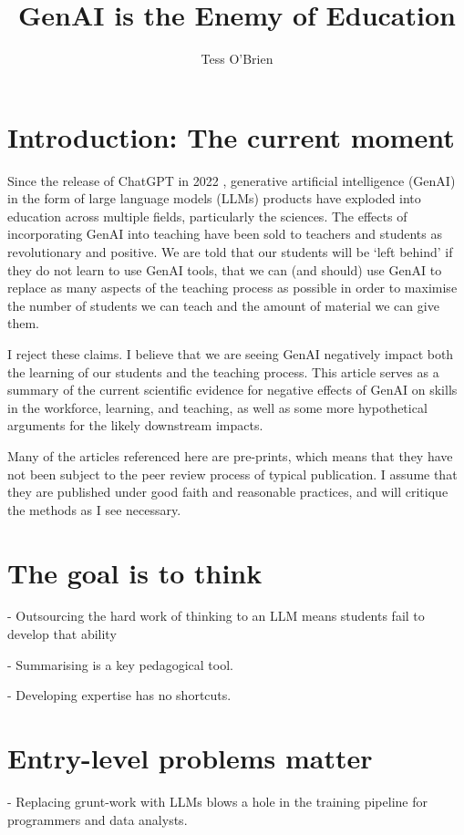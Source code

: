 \documentclass[12pt]{article}
\title{GenAI is the Enemy of Education}
\author{Tess O'Brien}
\begin{document}
\maketitle



\section{Introduction: The current moment}
Since the release of ChatGPT in 2022 \citep{chatgptRelease2022}, generative artificial intelligence (GenAI) in the form of large language models (LLMs) products have exploded into education across multiple fields, particularly the sciences. The effects of incorporating GenAI into teaching have been sold to teachers and students as revolutionary and positive. We are told that our students will be `left behind' if they do not learn to use GenAI tools, that we can (and should) use GenAI to replace as many aspects of the teaching process as possible in order to maximise the number of students we can teach and the amount of material we can give them.

I reject these claims. I believe that we are seeing GenAI negatively impact both the learning of our students and the teaching process. This article serves as a summary of the current scientific evidence for negative effects of GenAI on skills in the workforce, learning, and teaching, as well as some more hypothetical arguments for the likely downstream impacts. 

Many of the articles referenced here are pre-prints, which means that they have not been subject to the peer review process of typical publication. I assume that they are published under good faith and reasonable practices, and will critique the methods as I see necessary.

\section{The goal is to think}
- Outsourcing the hard work of thinking to an LLM means students fail to develop that ability

- Summarising is a key pedagogical tool.

- Developing expertise has no shortcuts.


\section{Entry-level problems matter}
- Replacing grunt-work with LLMs blows a hole in the training pipeline for programmers and data analysts.
\end{document}

